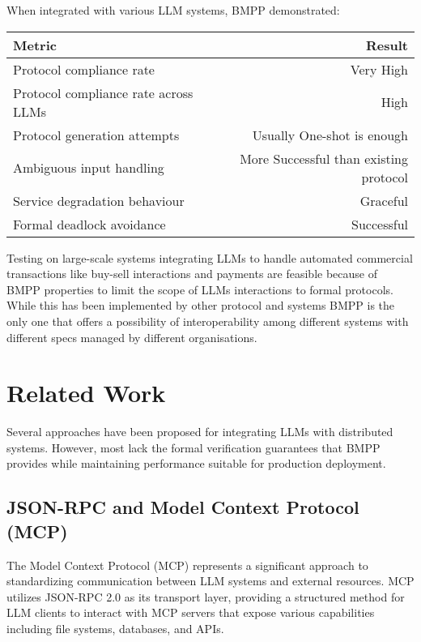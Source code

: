 \documentclass[11pt,a4paper]{article}
\begin{document}
	When integrated with various LLM systems, BMPP demonstrated:
	\begin{center}
		\begin{tabular}{lr}
			\hline
			\textbf{Metric} & \textbf{Result} \\
			\hline
			Protocol compliance rate & Very High \\
			Protocol compliance rate across LLMs & High \\
			Protocol generation attempts & Usually One-shot is enough \\
			Ambiguous input handling & More Successful than existing protocol \\
			Service degradation behaviour & Graceful \\
			Formal deadlock avoidance & Successful \\
			\hline
		\end{tabular}
	\end{center}
	
	Testing on large-scale systems integrating LLMs to handle automated commercial transactions like buy-sell interactions and payments are feasible because of BMPP properties to limit the scope of LLMs interactions to formal protocols. While this has been implemented by other protocol and systems BMPP is the only one that offers a possibility of interoperability among different systems with different specs managed by different organisations. 
	
	\section{Related Work}
	\label{sec:related}
	
	Several approaches have been proposed for integrating LLMs with distributed systems. However, most lack the formal verification guarantees that BMPP provides while maintaining performance suitable for production deployment.
	
	\subsection{JSON-RPC and Model Context Protocol (MCP)}
	\label{subsec:json-rpc-mcp}
	
	The Model Context Protocol (MCP) represents a significant approach to standardizing communication between LLM systems and external resources. MCP utilizes JSON-RPC 2.0 as its transport layer, providing a structured method for LLM clients to interact with MCP servers that expose various capabilities including file systems, databases, and APIs.
	
\end{document}
